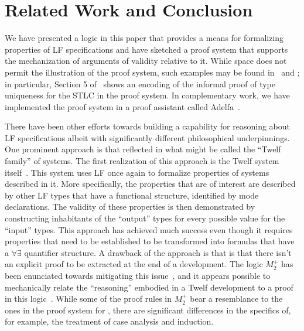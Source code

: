 \section{Related Work and Conclusion}\label{sec:conclusion}

We have presented a logic in this paper that provides
a means for formalizing properties of LF specifications and have
sketched a proof system that supports the mechanization of arguments
of validity relative to it. 
%
While space does not permit the illustration of the proof
system, such examples may be found in~\cite{nadathur21arxiv} and
\cite{southern21phd}; in particular, Section 5
of~\cite{nadathur21arxiv} shows an encoding of the informal proof of
type uniqueness for the STLC in the proof system.
%
In complementary work, we have implemented the proof system in a proof
assistant called Adelfa~\cite{southern21phd,southern21lfmtp}. 

There have been other efforts towards building a capability for
reasoning about LF specifications albeit with significantly different
philosophical underpinnings. 
%
One prominent approach is that reflected in what might be called the
``Twelf family'' of systems.
%
The first realization of this approach is the Twelf system
itself~\cite{pfenning99cade}. 
%
This system uses LF once again to formalize properties of systems
described in it.
%
More specifically, the properties that are of interest are described
by other LF types that have a functional structure, identified by mode
declarations. 
%
The validity of these properties is then demonstrated by constructing
inhabitants of the ``output'' types for every possible value for the
``input'' types.
%
This approach has achieved much success even though it requires
properties that need to be established to be transformed into formulas
that have a $\forall\exists$ quantifier structure.
%
A drawback of the approach is that is that there isn't an
explicit proof to be extracted at the end of a development.
%
The logic $M_2^+$ has been enunciated towards mitigating this
issue~\cite{schurmann00phd}, and it appears possible to mechanically 
relate the ``reasoning'' embodied in a Twelf development to a proof in
this logic~\cite{wang13lfmtp}.
%
While some of the proof rules in $M_2^+$ bear a resemblance to the
ones in the proof system for \logic, there are significant differences
in the specifics of, for example, the treatment of case analysis and
induction.


